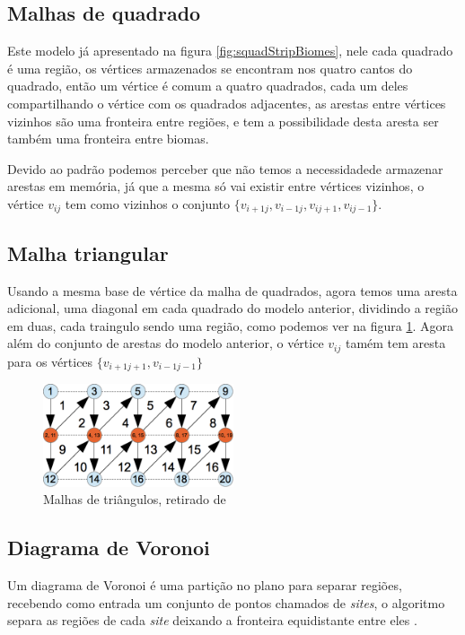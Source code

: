 \subsection{Malhas de quadrado}
Este modelo já apresentado na figura \ref{fig:squadStripBiomes}, nele cada
quadrado é uma região, os vértices armazenados se encontram nos quatro cantos
do quadrado, então um vértice é comum a quatro quadrados, cada um deles
compartilhando o vértice com os quadrados adjacentes, as arestas entre vértices
vizinhos são uma fronteira entre regiões, e tem a possibilidade desta aresta ser
também uma fronteira entre biomas.

Devido ao padrão podemos perceber que não temos a necessidadede armazenar arestas
em memória, já que a mesma só vai existir entre vértices vizinhos, o vértice
$v_{i j}$ tem como vizinhos o conjunto $\{v_{i+1 j}, v_{i-1 j}, v_{i j+1}, v_{i j-1}\}$.
\subsection{Malha triangular}
Usando a mesma base de vértice da malha de quadrados, agora temos uma aresta
adicional, uma diagonal em cada quadrado do modelo anterior, dividindo a região
em duas, cada traingulo sendo uma região, como podemos ver na figura \ref{fig:vbo}.
Agora além do conjunto de arestas do modelo anterior, o vértice $v_{i j}$ tamém tem
aresta para os vértices $\{v_{i+1 j+1}, v_{i-1 j-1}\}$
\begin{figure}[H]
    \centering
    \includegraphics[width=0.5\textwidth]{figuras/vbo.png}
    \caption{Malhas de triângulos, retirado de \cite{androidtrianglestrip}}
    \label{fig:vbo}
\end{figure}


\subsection{Diagrama de Voronoi}
Um diagrama de Voronoi é uma partição no plano para separar regiões, recebendo
como entrada um conjunto de pontos chamados de \textit{sites}, o algoritmo
separa as regiões de cada \textit{site} deixando a fronteira equidistante entre eles
\cite{fortune1987sweepline}.

